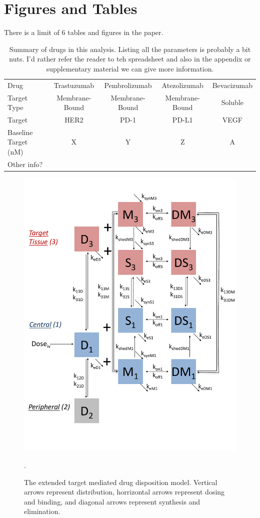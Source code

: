 \section{Figures and Tables}

There is a limit of 6 tables and figures in the paper.

\begin{table}[H]
\begin{center}
\begin{tabular}{ |l|c|c|c|c| } 
 \hline
 Drug & Trastuzumab & Pembrolizumab & Atezolizumab & Bevacizumab \\ 
 Target Type & Membrane-Bound & Membrane-Bound & Membrane-Bound & Soluble \\
 Target & HER2 & PD-1 & PD-L1 & VEGF \\ 
 Baseline Target (nM) & X & Y & Z & A \\ 
 Other info?\\
 \hline
\end{tabular}
\end{center}
\caption{Summary of drugs in this analysis.  Listing all the parameters is probably a bit nuts.  I'd rather refer the reader to teh spreadsheet and also in the appendix or supplementary material we can give more information.}
\end{table}

\begin{figure}[H]
\centering
\includegraphics[width=\textwidth]{figures/ivsc_3cmtct_sm_full.pdf}
\caption{The extended target mediated drug disposition model.  Vertical arrows represent distribution, horrizontal arrows represent dosing and binding, and diagonal arrows represent synthesis and elimination. 
\label{fig:model}}.
\end{figure}

